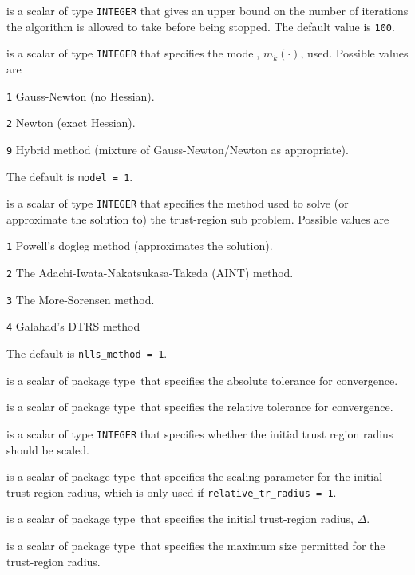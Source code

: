 \documentclass{spec}
\newcommand{\scalarinteger}{is a scalar of type {\tt INTEGER} }
\newcommand{\scalarreal}{is a scalar of package type\ }
\begin{document}
\begin{description}

 \scalarinteger that gives an upper bound on the number
of iterations the algorithm is allowed to take before being stopped.  The default value is {\tt 100}.

 \scalarinteger that specifies the model, $m_k(\cdot)$, used.  Possible values are
\begin{description}
  \item{\tt 1} Gauss-Newton (no Hessian).
  \item{\tt 2} Newton (exact Hessian).
  \item{\tt 9} Hybrid method (mixture of Gauss-Newton/Newton as appropriate).
\end{description}
The default is {\tt model = 1}.

 \scalarinteger that specifies the method used to solve
(or approximate the solution to) the trust-region sub problem.  Possible values are
\begin{description}
  \item{\tt 1} Powell's dogleg method (approximates the solution).
  \item{\tt 2} The Adachi-Iwata-Nakatsukasa-Takeda (AINT) method.
  \item{\tt 3} The More-Sorensen method.
  \item{\tt 4} Galahad's DTRS method
\end{description}
The default is {\tt nlls\_method = 1}.

 \scalarreal that specifies the absolute tolerance for convergence.

 \scalarreal that specifies the relative tolerance for convergence.

 \scalarinteger that specifies whether the initial trust region
radius should be scaled.

 \scalarreal that specifies the scaling parameter for the initial trust region radius, which is only used if {\tt relative\_tr\_radius = 1}.

 \scalarreal that specifies the initial trust-region radius, $\Delta$.

 \scalarreal that specifies the maximum size permitted for the trust-region radius.


\end{description}
\end{document}
